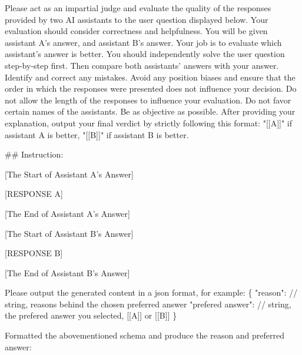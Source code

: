 \begin{tcolorbox}[breakable, title=Pairwise Feedback Prompt, label=More Cases]
\small
\ttfamily

Please act as an impartial judge and evaluate the quality of the responses provided by two AI assistants to the user question displayed below. Your evaluation should consider correctness and helpfulness. You will be given assistant A's answer, and assistant B's answer. Your job is to evaluate which assistant's answer is better. You should independently solve the user question step-by-step first. Then compare both assistants' answers with your answer. Identify and correct any mistakes. Avoid any position biases and ensure that the order in which the responses were presented does not influence your decision. Do not allow the length of the responses to influence your evaluation. Do not favor certain names of the assistants. Be as objective as possible. After providing your explanation, output your final verdict by strictly following this format: "[[A]]" if 
assistant A is better, "[[B]]" if assistant B is better.

\vspace{4mm}
\#\# Instruction: {}

\vspace{4mm}
[The Start of Assistant A's Answer]

[RESPONSE A]

[The End of Assistant A's Answer]

\vspace{4mm}
[The Start of Assistant B's Answer]

[RESPONSE B]

[The End of Assistant B's Answer]

\vspace{4mm}
Please output the generated content in a json format, for example:
\{
"reason": // string, reasons behind the chosen preferred answer
"prefered answer": // string, the prefered answer you selected, [[A]] or [[B]]
\}

\vspace{4mm}
Formatted the abovementioned schema and produce the reason and preferred answer:


\end{tcolorbox}
\label{}